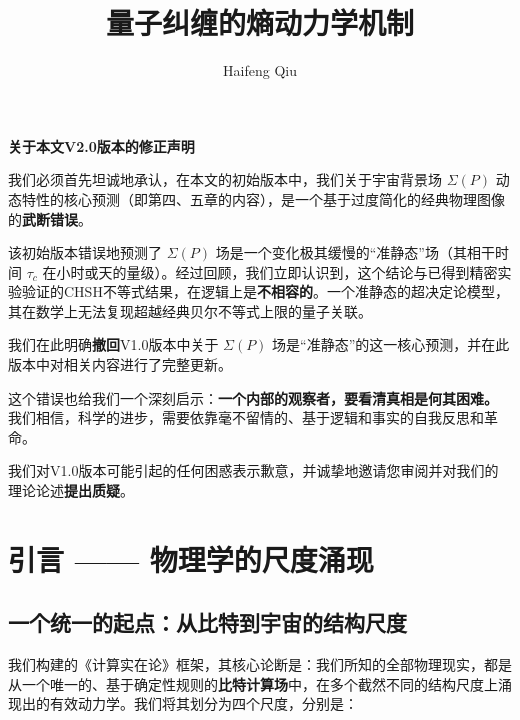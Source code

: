 \documentclass[12pt]{article}
\title{\textbf{量子纠缠的熵动力学机制}}
\author{Haifeng Qiu}
\begin{document}
\begin{titlepage}
\thispagestyle{empty} %
\begin{center}
\vspace{4mm}
\textbf{ 关于本文V2.0版本的修正声明}
\vspace{4mm}
\end{center}

我们必须首先坦诚地承认，在本文的初始版本中，我们关于宇宙背景场 $\Sigma(P)$ 动态特性的核心预测（即第四、五章的内容），是一个基于过度简化的经典物理图像的\textbf{武断错误}。

该初始版本错误地预测了 $\Sigma(P)$ 场是一个变化极其缓慢的``准静态''场（其相干时间 $\tau_c$ 在小时或天的量级）。经过回顾，我们立即认识到，这个结论与已得到精密实验验证的CHSH不等式结果，在逻辑上是\textbf{不相容的}。一个准静态的超决定论模型，其在数学上无法复现超越经典贝尔不等式上限的量子关联。

我们在此明确\textbf{撤回}V1.0版本中关于 $\Sigma(P)$ 场是``准静态''的这一核心预测，并在此版本中对相关内容进行了完整更新。

这个错误也给我们一个深刻启示：\textbf{一个内部的观察者，要看清真相是何其困难。} 我们相信，科学的进步，需要依靠毫不留情的、基于逻辑和事实的自我反思和革命。

\vspace{1cm}

我们对V1.0版本可能引起的任何困惑表示歉意，并诚挚地邀请您审阅并对我们的理论论述\textbf{提出质疑}。
\vspace*{\fill}
\end{titlepage}

\clearpage



\maketitle
\thispagestyle{empty} %
\newpage
\setcounter{page}{1}

\section{引言 —— 物理学的尺度涌现}

\subsection{一个统一的起点：从比特到宇宙的结构尺度}

我们构建的《计算实在论》框架，其核心论断是：我们所知的全部物理现实，都是从一个唯一的、基于确定性规则的\textbf{比特计算场}中，在多个截然不同的结构尺度上涌现出的有效动力学。我们将其划分为四个尺度，分别是：
\end{document}
